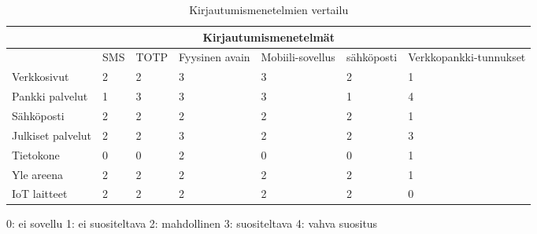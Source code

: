 \begin{table}[ht]
\begin{tabular}{ |p{3cm}|p{1cm}|p{}|p{}|p{}|p{2cm}|p{}|  }
 \hline
 \multicolumn{7}{|c|}{ Kirjautumismenetelmät} \\
 \hline
 & SMS & TOTP &Fyysinen avain & Mobiili-sovellus & sähköposti & Verkkopankki-tunnukset\\
 \hline
 Verkkosivut& 2 & 2 & 3 & 3 & 2 &  1\\
 Pankki palvelut& 1 & 3 & 3 & 3 & 1 &  4\\
 Sähköposti& 2 & 2 & 2 & 2 & 2 & 1 \\
 Julkiset palvelut& 2 & 2 & 3 & 2 & 2 &  3\\
 Tietokone& 0 & 0 & 2 & 0 & 0 &  1\\
 Yle areena& 2 & 2 & 2 & 2 & 2 &  1\\
 IoT laitteet& 2 & 2 & 2 & 2 & 2 &  0\\
 \hline
\end{tabular}
\caption{\label{tab:vertailu} Kirjautumismenetelmien vertailu}
\end{table}

0: ei sovellu
1: ei suositeltava
2: mahdollinen
3: suositeltava
4: vahva suositus
